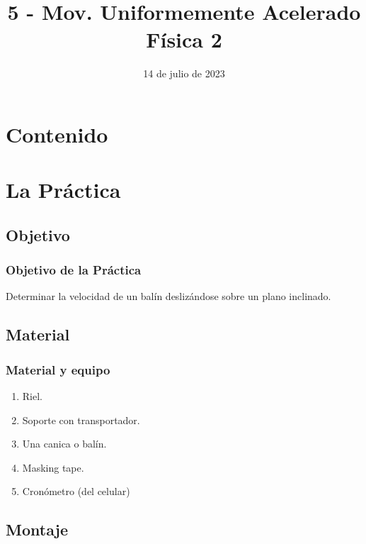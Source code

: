 \documentclass[14pt]{beamer}
\title{\Large{5 - Mov. Uniformemente Acelerado} \\ \normalsize{Física 2}}
\date{14 de julio de 2023}
\begin{document}
\maketitle

\section*{Contenido}

\section{La Práctica}
\subsection{Objetivo}

\begin{frame}
\frametitle{Objetivo de la Práctica}
Determinar la velocidad de un balín deslizándose sobre un plano inclinado.
\end{frame}

\subsection{Material}

\begin{frame}
\frametitle{Material y equipo}
\begin{enumerate}[<+->]
\item Riel.
\item Soporte con transportador.
\item Una canica o balín.
\item Masking tape.
\item Cronómetro (del celular)
\end{enumerate}
\end{frame}

\subsection{Montaje}
\end{document}
